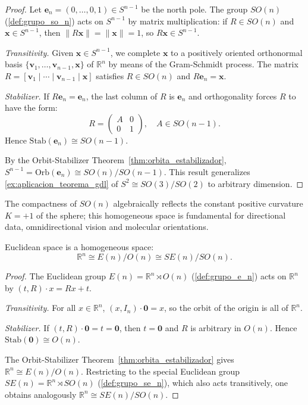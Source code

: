 \begin{proof}
Let $\mathbf{e}_n = (0,\ldots,0,1) \in S^{n-1}$ be the north pole. The group $SO(n)$ (\autoref{def:grupo_so_n}) acts on $S^{n-1}$ by matrix multiplication: if $R \in SO(n)$ and $\mathbf{x} \in S^{n-1}$, then $\|R\mathbf{x}\| = \|\mathbf{x}\| = 1$, so $R\mathbf{x} \in S^{n-1}$.

\textit{Transitivity.} Given $\mathbf{x} \in S^{n-1}$, we complete $\mathbf{x}$ to a positively oriented orthonormal basis $\{\mathbf{v}_1, \ldots, \mathbf{v}_{n-1}, \mathbf{x}\}$ of $\mathbb{R}^n$ by means of the Gram-Schmidt process. The matrix $R = [\mathbf{v}_1 \mid \cdots \mid \mathbf{v}_{n-1} \mid \mathbf{x}]$ satisfies $R \in SO(n)$ and $R\mathbf{e}_n = \mathbf{x}$.

\textit{Stabilizer.} If $R\mathbf{e}_n = \mathbf{e}_n$, the last column of $R$ is $\mathbf{e}_n$ and orthogonality forces $R$ to have the form:
\[
R = \begin{pmatrix} A & 0 \\ 0 & 1 \end{pmatrix}, \quad A \in SO(n-1).
\]
Hence $\mathrm{Stab}(\mathbf{e}_n) \cong SO(n-1)$.

By the Orbit-Stabilizer Theorem~\ref{thm:orbita_estabilizador}, $S^{n-1} = \mathrm{Orb}(\mathbf{e}_n) \cong SO(n)/SO(n-1)$. This result generalizes \autoref{ex:aplicacion_teorema_gdl} of $S^2 \cong SO(3)/SO(2)$ to arbitrary dimension.
\end{proof}

The compactness of $SO(n)$ algebraically reflects the constant positive curvature $K=+1$ of the sphere; this homogeneous space is fundamental for directional data, omnidirectional vision and molecular orientations.

\begin{proposition}\label{prop:euclidiano_cociente}
Euclidean space is a homogeneous space:
\[
\mathbb{R}^n \cong E(n)/O(n) \cong SE(n)/SO(n).
\]
\end{proposition}

\begin{proof}
The Euclidean group $E(n) = \mathbb{R}^n \rtimes O(n)$ (\autoref{def:grupo_e_n}) acts on $\mathbb{R}^n$ by $(t, R) \cdot x = Rx + t$.

\textit{Transitivity.} For all $x \in \mathbb{R}^n$, $(x, I_n) \cdot \mathbf{0} = x$, so the orbit of the origin is all of $\mathbb{R}^n$.

\textit{Stabilizer.} If $(t, R) \cdot \mathbf{0} = t = \mathbf{0}$, then $t = \mathbf{0}$ and $R$ is arbitrary in $O(n)$. Hence $\mathrm{Stab}(\mathbf{0}) \cong O(n)$.

The Orbit-Stabilizer Theorem~\ref{thm:orbita_estabilizador} gives $\mathbb{R}^n \cong E(n)/O(n)$. Restricting to the special Euclidean group $SE(n) = \mathbb{R}^n \rtimes SO(n)$ (\autoref{def:grupo_se_n}), which also acts transitively, one obtains analogously $\mathbb{R}^n \cong SE(n)/SO(n)$.
\end{proof}

